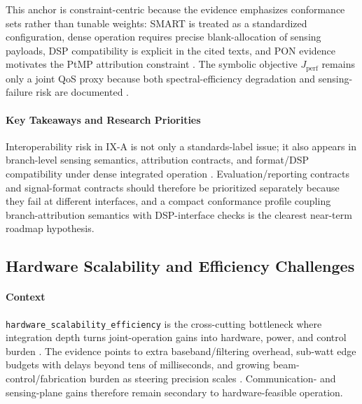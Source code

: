 \documentclass[letterpaper,journal]{IEEEtran}
\begin{document}
This anchor is constraint-centric because the evidence emphasizes conformance sets rather than tunable weights: SMART is treated as a standardized configuration, dense operation requires precise blank-allocation of sensing payloads, DSP compatibility is explicit in the cited texts, and PON evidence motivates the PtMP attribution constraint \cite{O_ISAC_220, O_ISAC_104}. The symbolic objective $J_{\mathrm{perf}}$ remains only a joint QoS proxy because both spectral-efficiency degradation and sensing-failure risk are documented \cite{O_ISAC_220, O_ISAC_104}.

\paragraph{Key Takeaways and Research Priorities}
Interoperability risk in IX-A is not only a standards-label issue; it also appears in branch-level sensing semantics, attribution contracts, and format/DSP compatibility under dense integrated operation \cite{O_ISAC_104, O_ISAC_220}. Evaluation/reporting contracts and signal-format contracts should therefore be prioritized separately because they fail at different interfaces, and a compact conformance profile coupling branch-attribution semantics with DSP-interface checks is the clearest near-term roadmap hypothesis.

\subsection{Hardware Scalability and Efficiency Challenges}

\paragraph{Context}
\texttt{hardware\_scalability\_efficiency} is the cross-cutting bottleneck where integration depth turns joint-operation gains into hardware, power, and control burden \cite{O_ISAC_035, O_ISAC_162}. The evidence points to extra baseband/filtering overhead, sub-watt edge budgets with delays beyond tens of milliseconds, and growing beam-control/fabrication burden as steering precision scales \cite{O_ISAC_093, O_ISAC_162, O_ISAC_171}. Communication- and sensing-plane gains therefore remain secondary to hardware-feasible operation.
\end{document}

